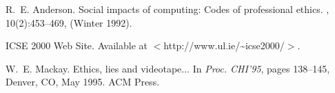 
\begin{thebibliography}{1}

R.~E. Anderson.
\newblock Social impacts of computing: {C}odes of professional ethics.
, 10(2):453--469, (Winter 1992).

ICSE 2000 {W}eb {S}ite. {A}vailable at 
  $<$http://www.ul.ie/\~{\space}icse2000/$>$.

W.~E. Mackay.
\newblock Ethics, lies and videotape...
\newblock In {\em Proc. CHI'95}, pages 138--145, Denver, CO, May 1995. ACM
  Press.

\end{thebibliography}

